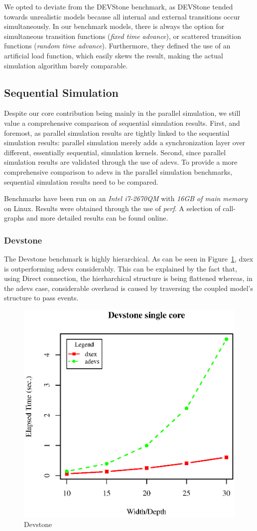 We opted to deviate from the DEVStone benchmark, as DEVStone tended towards unrealistic models because all internal and external transitions occur simultaneously.
In our benchmark models, there is always the option for simultaneous transition functions (\textit{fixed time advance}), or scattered transition functions (\textit{random time advance}).
Furthermore, they defined the use of an artificial load function, which easily skews the result, making the actual simulation algorithm barely comparable.


\subsection{Sequential Simulation}
Despite our core contribution being mainly in the parallel simulation, we still value a comprehensive comparison of sequential simulation results.
First, and foremost, as parallel simulation results are tightly linked to the sequential simulation results: parallel simulation merely adds a synchronization layer over different, essentially sequential, simulation kernels.
Second, since parallel simulation results are validated through the use of adevs.
To provide a more comprehensive comparison to adevs in the parallel simulation benchmarks, sequential simulation results need to be compared.

Benchmarks have been run on an \textit{Intel i7-2670QM} with \textit{16GB of main memory} on Linux.
Results were obtained through the use of \textit{perf}.
A selection of call-graphs and more detailed results can be found online.

\subsubsection{Devstone}
The Devstone \cite{DEVStone} benchmark is highly hierarchical. As can be seen in Figure~\ref{fig:Devstone}, dxex is outperforming adevs considerably. This can be explained by the fact that, using Direct connection, the hierharchical structure is being flattened whereas, in the adevs case, considerable overhead is caused by traversing the coupled model's structure to pass events.
\begin{figure}[h]
	\includegraphics[width=.5\textwidth]{fig/fig1.eps}
	\caption{Devstone}
	\label{fig:Devstone}
\end{figure}

